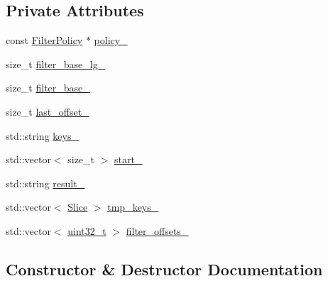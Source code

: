 \subsection*{Private Attributes}
\begin{DoxyCompactItemize}
\item 
const \hyperlink{classleveldb_1_1_filter_policy}{Filter\+Policy} $\ast$ \hyperlink{classleveldb_1_1_filter_block_builder_ae1fcb392ca7421a33699f516e3c724e0}{policy\+\_\+}
\item 
size\+\_\+t \hyperlink{classleveldb_1_1_filter_block_builder_ad7360d07cb6e78effad4e7fb2f8fb5e0}{filter\+\_\+base\+\_\+lg\+\_\+}
\item 
size\+\_\+t \hyperlink{classleveldb_1_1_filter_block_builder_a924668e8806bd0dc3c2c4d35f5160b6a}{filter\+\_\+base\+\_\+}
\item 
size\+\_\+t \hyperlink{classleveldb_1_1_filter_block_builder_abf6f899c5ef988b7e5c40e3123b6cde0}{last\+\_\+offset\+\_\+}
\item 
std\+::string \hyperlink{classleveldb_1_1_filter_block_builder_a948705862c1b6c371e6044f588de489a}{keys\+\_\+}
\item 
std\+::vector$<$ size\+\_\+t $>$ \hyperlink{classleveldb_1_1_filter_block_builder_a17f19fc8365e35a5808c97482f2fea3a}{start\+\_\+}
\item 
std\+::string \hyperlink{classleveldb_1_1_filter_block_builder_ad8230068e41814f72ad4097803dfe382}{result\+\_\+}
\item 
std\+::vector$<$ \hyperlink{classleveldb_1_1_slice}{Slice} $>$ \hyperlink{classleveldb_1_1_filter_block_builder_a3f111a41d738802bdd2a6c50892718f5}{tmp\+\_\+keys\+\_\+}
\item 
std\+::vector$<$ \hyperlink{stdint_8h_a435d1572bf3f880d55459d9805097f62}{uint32\+\_\+t} $>$ \hyperlink{classleveldb_1_1_filter_block_builder_ac53c5d18c650072ad09596bf8c3f0e7a}{filter\+\_\+offsets\+\_\+}
\end{DoxyCompactItemize}


\subsection{Constructor \& Destructor Documentation}
\hypertarget{classleveldb_1_1_filter_block_builder_a8e8b5ae95df5a13c035bec85e22549ca}{}
